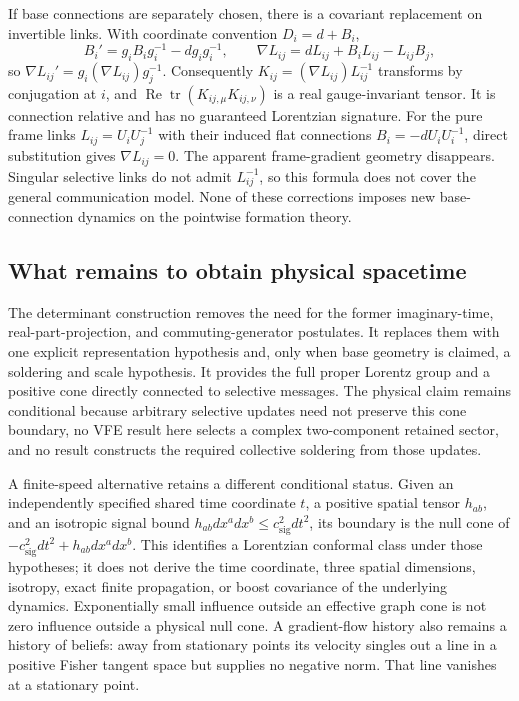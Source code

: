 If base connections are separately chosen, there is a covariant replacement on invertible links. With coordinate convention $D_i=d+B_i$,
\begin{equation}
B_i'=g_iB_ig_i^{-1}-dg_ig_i^{-1},\qquad
\nabla L_{ij}=dL_{ij}+B_iL_{ij}-L_{ij}B_j,
\label{eq:lor-link-covariant-derivative}
\end{equation}
so $\nabla L_{ij}'=g_i(\nabla L_{ij})g_j^{-1}$. Consequently $K_{ij}=(\nabla L_{ij})L_{ij}^{-1}$ transforms by conjugation at $i$, and $\operatorname{Re}\operatorname{tr}(K_{ij,\mu}K_{ij,\nu})$ is a real gauge-invariant tensor. It is connection relative and has no guaranteed Lorentzian signature. For the pure frame links $L_{ij}=U_iU_j^{-1}$ with their induced flat connections $B_i=-dU_iU_i^{-1}$, direct substitution gives $\nabla L_{ij}=0$. The apparent frame-gradient geometry disappears. Singular selective links do not admit $L_{ij}^{-1}$, so this formula does not cover the general communication model. None of these corrections imposes new base-connection dynamics on the pointwise formation theory.

\subsection{What remains to obtain physical spacetime}
\label{sec:causal_cone_route}

The determinant construction removes the need for the former imaginary-time, real-part-projection, and commuting-generator postulates. It replaces them with one explicit representation hypothesis and, only when base geometry is claimed, a soldering and scale hypothesis. It provides the full proper Lorentz group and a positive cone directly connected to selective messages. The physical claim remains conditional because arbitrary selective updates need not preserve this cone boundary, no VFE result here selects a complex two-component retained sector, and no result constructs the required collective soldering from those updates.

A finite-speed alternative retains a different conditional status. Given an independently specified shared time coordinate $t$, a positive spatial tensor $h_{ab}$, and an isotropic signal bound $h_{ab}dx^adx^b\leq c_{\mathrm{sig}}^2dt^2$, its boundary is the null cone of $-c_{\mathrm{sig}}^2dt^2+h_{ab}dx^adx^b$. This identifies a Lorentzian conformal class under those hypotheses; it does not derive the time coordinate, three spatial dimensions, isotropy, exact finite propagation, or boost covariance of the underlying dynamics. Exponentially small influence outside an effective graph cone is not zero influence outside a physical null cone. A gradient-flow history also remains a history of beliefs: away from stationary points its velocity singles out a line in a positive Fisher tangent space but supplies no negative norm. That line vanishes at a stationary point.


